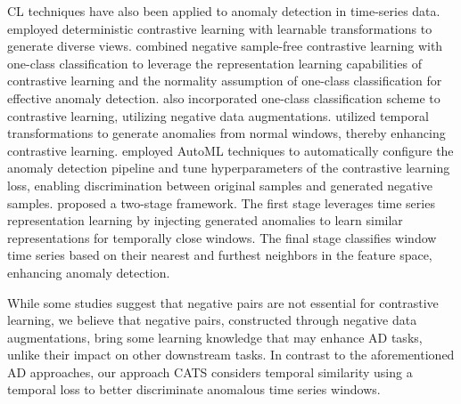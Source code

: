 CL techniques have also been applied to anomaly detection in time-series data. \cite{qiu2021neural} employed deterministic contrastive learning with learnable transformations to generate diverse views. \cite{wang2023deep} combined negative sample-free contrastive learning with one-class classification to leverage the representation learning capabilities of contrastive learning and the normality assumption of one-class classification for effective anomaly detection. \cite{kim2023contrastive} also incorporated one-class classification scheme to contrastive learning, utilizing negative data augmentations. \cite{li2023contrastive} utilized temporal transformations to generate anomalies from normal windows, thereby enhancing contrastive learning. \cite{jiao2022timeautoad} employed AutoML techniques to automatically configure the anomaly detection pipeline and tune hyperparameters of the contrastive learning loss, enabling discrimination between original samples and generated negative samples. \cite{DARBAN2025110874} proposed a two-stage framework. The first stage leverages time series representation learning by injecting generated anomalies to learn similar representations for temporally close windows. The final stage classifies window time series based on their nearest and furthest neighbors in the feature space, enhancing anomaly detection.

While some studies suggest that negative pairs are not essential for contrastive learning, we believe that negative pairs, constructed through negative data augmentations, bring some learning knowledge that may enhance AD tasks, unlike their impact on other downstream tasks. In contrast to the aforementioned AD approaches, our approach CATS considers temporal similarity using a temporal loss to better discriminate anomalous time series windows.



